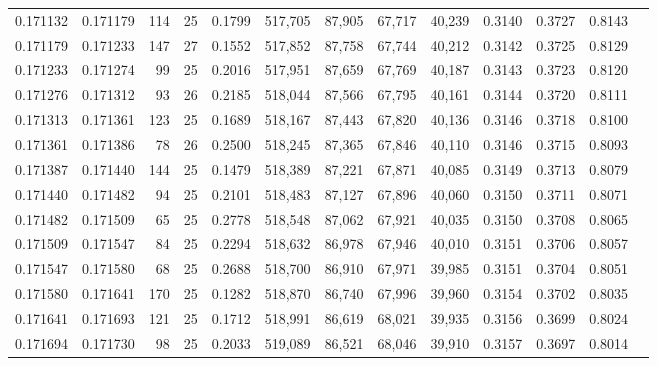 \begin{tabular}{rrrrrrrrrrrrr}
0.171132 & 0.171179 &   114 &  25 &                                     0.1799 & 517,705 &  87,905 &  67,717 &  40,239 & 0.3140 & 0.3727 & 0.8143 \\
0.171179 & 0.171233 &   147 &  27 &                                     0.1552 & 517,852 &  87,758 &  67,744 &  40,212 & 0.3142 & 0.3725 & 0.8129 \\
0.171233 & 0.171274 &    99 &  25 &                                     0.2016 & 517,951 &  87,659 &  67,769 &  40,187 & 0.3143 & 0.3723 & 0.8120 \\
0.171276 & 0.171312 &    93 &  26 &                                     0.2185 & 518,044 &  87,566 &  67,795 &  40,161 & 0.3144 & 0.3720 & 0.8111 \\
0.171313 & 0.171361 &   123 &  25 &                                     0.1689 & 518,167 &  87,443 &  67,820 &  40,136 & 0.3146 & 0.3718 & 0.8100 \\
0.171361 & 0.171386 &    78 &  26 &                                     0.2500 & 518,245 &  87,365 &  67,846 &  40,110 & 0.3146 & 0.3715 & 0.8093 \\
0.171387 & 0.171440 &   144 &  25 &                                     0.1479 & 518,389 &  87,221 &  67,871 &  40,085 & 0.3149 & 0.3713 & 0.8079 \\
0.171440 & 0.171482 &    94 &  25 &                                     0.2101 & 518,483 &  87,127 &  67,896 &  40,060 & 0.3150 & 0.3711 & 0.8071 \\
0.171482 & 0.171509 &    65 &  25 &                                     0.2778 & 518,548 &  87,062 &  67,921 &  40,035 & 0.3150 & 0.3708 & 0.8065 \\
0.171509 & 0.171547 &    84 &  25 &                                     0.2294 & 518,632 &  86,978 &  67,946 &  40,010 & 0.3151 & 0.3706 & 0.8057 \\
0.171547 & 0.171580 &    68 &  25 &                                     0.2688 & 518,700 &  86,910 &  67,971 &  39,985 & 0.3151 & 0.3704 & 0.8051 \\
0.171580 & 0.171641 &   170 &  25 &                                     0.1282 & 518,870 &  86,740 &  67,996 &  39,960 & 0.3154 & 0.3702 & 0.8035 \\
0.171641 & 0.171693 &   121 &  25 &                                     0.1712 & 518,991 &  86,619 &  68,021 &  39,935 & 0.3156 & 0.3699 & 0.8024 \\
0.171694 & 0.171730 &    98 &  25 &                                     0.2033 & 519,089 &  86,521 &  68,046 &  39,910 & 0.3157 & 0.3697 & 0.8014 \\

\end{tabular}
